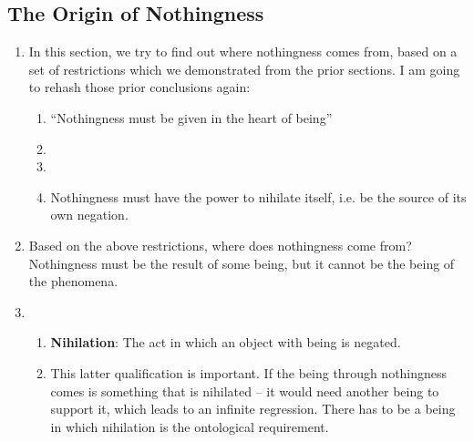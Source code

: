 \subsection{The Origin of Nothingness}

\begin{enumerate}
  \subsection*{The Origin of Nothingness in the Human Being}
  \item In this section, we try to find out where nothingness comes from, based on a set of restrictions which we demonstrated from the prior sections. I am going to rehash those prior conclusions again:
  \begin{enumerate}
    \item \enquote{Nothingness must be given in the heart of being}
    \item {}
    \item {}
    \item Nothingness must have the power to nihilate itself, i.e. be the source of its own negation.
  \end{enumerate}
  \item Based on the above restrictions, where does nothingness come from? Nothingness must be the result of some being, but it cannot be the being of the phenomena.
  \item {}
  \begin{enumerate}
    \item \textbf{Nihilation}: The act in which an object with being is negated.
    \item This latter qualification is important. If the being through nothingness comes is something that is nihilated -- it would need another being to support it, which leads to an infinite regression. There has to be a being in which nihilation is the ontological requirement.

\end{enumerate}
\end{enumerate}
